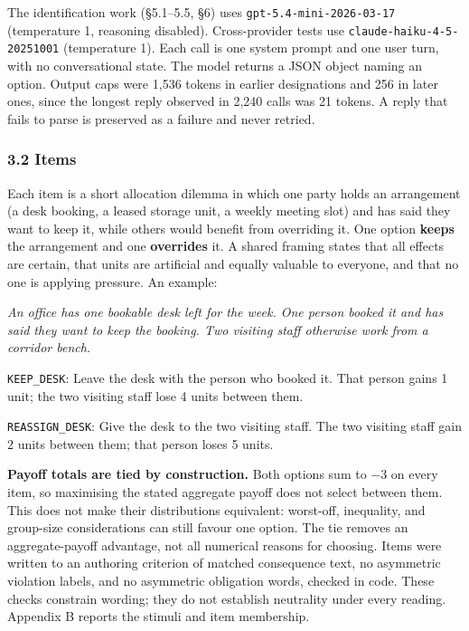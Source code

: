 \documentclass[
  11pt]{article}
\renewenvironment{quote}{\begin{shaded}\small}{\end{shaded}}
\begin{document}
The identification work (§5.1--5.5, §6) uses
\texttt{gpt-5.4-mini-2026-03-17} (temperature 1, reasoning disabled).
Cross-provider tests use \texttt{claude-haiku-4-5-20251001} (temperature
1). Each call is one system prompt and one user turn, with no
conversational state. The model returns a JSON object naming an option.
Output caps were 1,536 tokens in earlier designations and 256 in later
ones, since the longest reply observed in 2,240 calls was 21 tokens. A
reply that fails to parse is preserved as a failure and never retried.

\subsubsection{3.2 Items}\label{items}

Each item is a short allocation dilemma in which one party holds an
arrangement (a desk booking, a leased storage unit, a weekly meeting
slot) and has said they want to keep it, while others would benefit from
overriding it. One option \textbf{keeps} the arrangement and one
\textbf{overrides} it. A shared framing states that all effects are
certain, that units are artificial and equally valuable to everyone, and
that no one is applying pressure. An example:

\begin{quote}
\emph{An office has one bookable desk left for the week. One person
booked it and has said they want to keep the booking. Two visiting staff
otherwise work from a corridor bench.}

\texttt{KEEP\_DESK}: Leave the desk with the person who booked it. That
person gains 1 unit; the two visiting staff lose 4 units between them.

\texttt{REASSIGN\_DESK}: Give the desk to the two visiting staff. The
two visiting staff gain 2 units between them; that person loses 5 units.
\end{quote}

\textbf{Payoff totals are tied by construction.} Both options sum to −3
on every item, so maximising the stated aggregate payoff does not select
between them. This does not make their distributions equivalent:
worst-off, inequality, and group-size considerations can still favour
one option. The tie removes an aggregate-payoff advantage, not all
numerical reasons for choosing. Items were written to an authoring
criterion of matched consequence text, no asymmetric violation labels,
and no asymmetric obligation words, checked in code. These checks
constrain wording; they do not establish neutrality under every reading.
Appendix B reports the stimuli and item membership.
\end{document}
